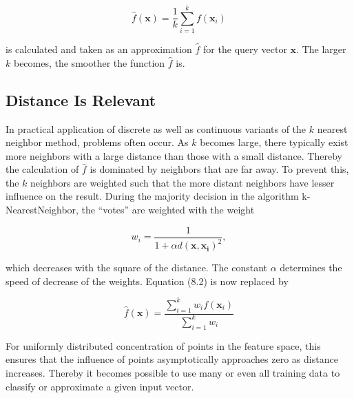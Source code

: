 \documentclass[10pt]{book}
\begin{document}
\begin{equation*}
\hat{f}(\boldsymbol{x})=\frac{1}{k} \sum_{i=1}^{k} f\left(\boldsymbol{x}_{i}\right) \tag{8.2}
\end{equation*}

is calculated and taken as an approximation $\hat{f}$ for the query vector $\boldsymbol{x}$. The larger $k$ becomes, the smoother the function $\hat{f}$ is.

\subsection{Distance Is Relevant}
In practical application of discrete as well as continuous variants of the $k$ nearest neighbor method, problems often occur. As $k$ becomes large, there typically exist more neighbors with a large distance than those with a small distance. Thereby the calculation of $\hat{f}$ is dominated by neighbors that are far away. To prevent this, the $k$ neighbors are weighted such that the more distant neighbors have lesser influence on the result. During the majority decision in the algorithm k-NearestNeighbor, the ``votes'' are weighted with the weight

\begin{equation*}
w_{i}=\frac{1}{1+\alpha d\left(\boldsymbol{x}, \boldsymbol{x}_{\boldsymbol{i}}\right)^{2}}, \tag{8.3}
\end{equation*}

which decreases with the square of the distance. The constant $\alpha$ determines the speed of decrease of the weights. Equation (8.2) is now replaced by

\begin{equation*}
\hat{f}(\boldsymbol{x})=\frac{\sum_{i=1}^{k} w_{i} f\left(\boldsymbol{x}_{i}\right)}{\sum_{i=1}^{k} w_{i}}
\end{equation*}

For uniformly distributed concentration of points in the feature space, this ensures that the influence of points asymptotically approaches zero as distance increases. Thereby it becomes possible to use many or even all training data to classify or approximate a given input vector.
\end{document}
